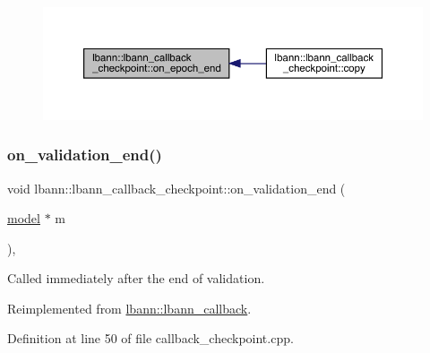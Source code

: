 \begin{figure}[H]
\begin{center}
\leavevmode
\includegraphics[width=350pt]{classlbann_1_1lbann__callback__checkpoint_a406bfba673e503e94ae6eb57aff6a78e_icgraph}
\end{center}
\end{figure}
\mbox{\label{classlbann_1_1lbann__callback__checkpoint_a5fb4288c03b1ce14681b72562e9471b2}} 
\subsubsection{\texorpdfstring{on\+\_\+validation\+\_\+end()}{on\_validation\_end()}}
{\footnotesize\ttfamily void lbann\+::lbann\+\_\+callback\+\_\+checkpoint\+::on\+\_\+validation\+\_\+end (\begin{DoxyParamCaption}\item[{\hyperlink{classlbann_1_1model}{model} $\ast$}]{m }\end{DoxyParamCaption})\hspace{0.3cm}{\ttfamily [override]}, {\ttfamily [virtual]}}

Called immediately after the end of validation. 

Reimplemented from \hyperlink{classlbann_1_1lbann__callback_adc16e42e5064dc2dc8d84dfbfc1325eb}{lbann\+::lbann\+\_\+callback}.



Definition at line 50 of file callback\+\_\+checkpoint.\+cpp.


